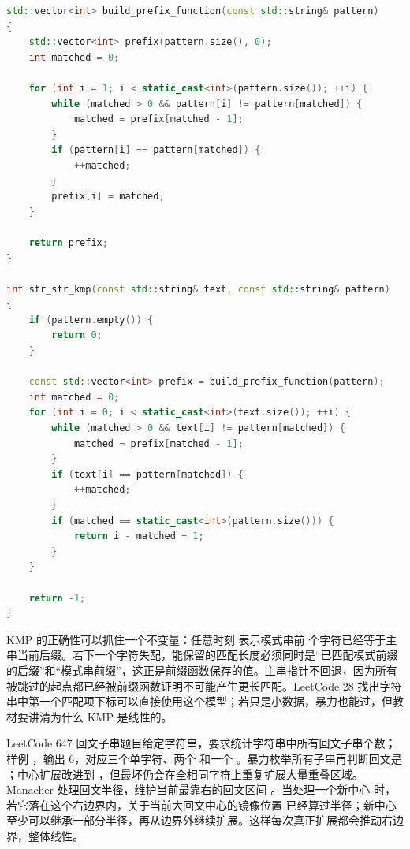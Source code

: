 \begin{lstlisting}[language=C++,caption={KMP 前缀函数：失配时复用已匹配前后缀}]
std::vector<int> build_prefix_function(const std::string& pattern)
{
    std::vector<int> prefix(pattern.size(), 0);
    int matched = 0;

    for (int i = 1; i < static_cast<int>(pattern.size()); ++i) {
        while (matched > 0 && pattern[i] != pattern[matched]) {
            matched = prefix[matched - 1];
        }
        if (pattern[i] == pattern[matched]) {
            ++matched;
        }
        prefix[i] = matched;
    }

    return prefix;
}

int str_str_kmp(const std::string& text, const std::string& pattern)
{
    if (pattern.empty()) {
        return 0;
    }

    const std::vector<int> prefix = build_prefix_function(pattern);
    int matched = 0;
    for (int i = 0; i < static_cast<int>(text.size()); ++i) {
        while (matched > 0 && text[i] != pattern[matched]) {
            matched = prefix[matched - 1];
        }
        if (text[i] == pattern[matched]) {
            ++matched;
        }
        if (matched == static_cast<int>(pattern.size())) {
            return i - matched + 1;
        }
    }

    return -1;
}
\end{lstlisting}

KMP 的正确性可以抓住一个不变量：任意时刻  表示模式串前  个字符已经等于主串当前后缀。若下一个字符失配，能保留的匹配长度必须同时是“已匹配模式前缀的后缀”和“模式串前缀”，这正是前缀函数保存的值。主串指针不回退，因为所有被跳过的起点都已经被前缀函数证明不可能产生更长匹配。LeetCode 28 找出字符串中第一个匹配项下标可以直接使用这个模型；若只是小数据，暴力也能过，但教材要讲清为什么 KMP 是线性的。

LeetCode 647 回文子串题目给定字符串，要求统计字符串中所有回文子串个数；样例 ，输出 6，对应三个单字符、两个  和一个 。暴力枚举所有子串再判断回文是 ；中心扩展改进到 ，但最坏仍会在全相同字符上重复扩展大量重叠区域。Manacher 处理回文半径，维护当前最靠右的回文区间 。当处理一个新中心  时，若它落在这个右边界内，关于当前大回文中心的镜像位置  已经算过半径；新中心至少可以继承一部分半径，再从边界外继续扩展。这样每次真正扩展都会推动右边界，整体线性。


